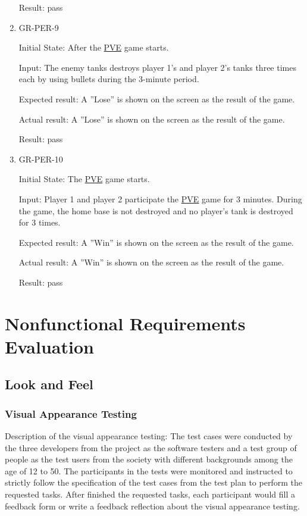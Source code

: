 \documentclass[12pt, titlepage]{article}
\begin{document}
\begin{enumerate}
Result: pass

\item{GR-PER-9\\}
					
Initial State: After the \underline{PVE} game starts.
					
Input: The enemy tanks destroys player 1's and player 2's tanks three times each by using bullets during the 3-minute period.
					
Expected result: A ”Lose” is shown on the screen as the result of the game.
					
Actual result: A ”Lose” is shown on the screen as the result of the game.

Result: pass

\item{GR-PER-10\\}
					
Initial State: The \underline{PVE} game starts.
					
Input: Player  1  and  player  2  participate  the  \underline{PVE}  game  for  3 minutes. During the game, the home base is not destroyed and no player’s tank is destroyed for 3 times.
					
Expected result: A ”Win” is shown on the screen as the result of the game.
					
Actual result: A ”Win” is shown on the screen as the result of the game.

Result: pass

\end{enumerate}

\section{Nonfunctional Requirements Evaluation}

\subsection{Look and Feel}
\subsubsection{Visual Appearance Testing}
Description of the visual appearance testing: The test cases were conducted by the three developers from the project as the software testers and a test group of people as the test users from the society with different backgrounds among the age of 12 to 50. The participants in the tests were monitored and instructed to strictly follow the specification of the test cases from the test plan to perform the requested tasks. After finished the requested tasks, each participant would fill a feedback form or write a feedback reflection about the visual appearance testing.
\end{document}
